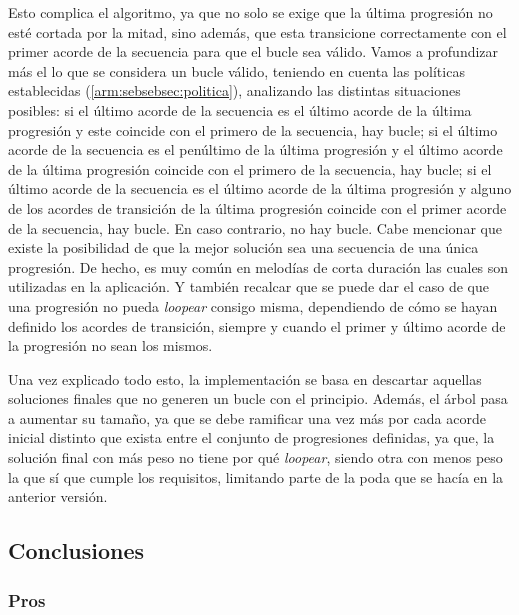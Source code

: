 Esto complica el algoritmo, ya que no solo se exige que la última progresión no esté cortada por la mitad, sino además, que esta transicione correctamente con el primer acorde de la secuencia para que el bucle sea válido. Vamos a profundizar más el lo que se considera un bucle válido, teniendo en cuenta las políticas establecidas (\ref{arm:sebsebsec:politica}), analizando las distintas situaciones posibles: si el último acorde de la secuencia es el último acorde de la última progresión y este coincide con el primero de la secuencia, hay bucle; si el último acorde de la secuencia es el penúltimo de la última progresión y el último acorde de la última progresión coincide con el primero de la secuencia, hay bucle; si el último acorde de la secuencia es el último acorde de la última progresión y alguno de los acordes de transición de la última progresión coincide con el primer acorde de la secuencia, hay bucle. En caso contrario, no hay bucle. Cabe mencionar que existe la posibilidad de que la mejor solución sea una secuencia de una única progresión. De hecho, es muy común en melodías de corta duración las cuales son utilizadas en la aplicación. Y también recalcar que se puede dar el caso de que una progresión no pueda \textit{loopear} consigo misma, dependiendo de cómo se hayan definido los acordes de transición, siempre y cuando el primer y último acorde de la progresión no sean los mismos.

Una vez explicado todo esto, la implementación se basa en descartar aquellas soluciones finales que no generen un bucle con el principio. Además, el árbol pasa a aumentar su tamaño, ya que se debe ramificar una vez más por cada acorde inicial distinto que exista entre el conjunto de progresiones definidas, ya que, la solución final con más peso no tiene por qué \textit{loopear}, siendo otra con menos peso la que sí que cumple los requisitos, limitando parte de la poda que se hacía en la anterior versión.

\subsection{Conclusiones}

\subsubsection{Pros}

